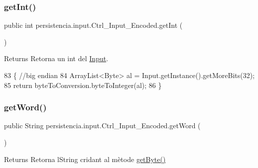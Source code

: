 \subsubsection{\texorpdfstring{get\+Int()}{getInt()}}
{\footnotesize\ttfamily public int persistencia.\+input.\+Ctrl\+\_\+\+Input\+\_\+\+Encoded.\+get\+Int (\begin{DoxyParamCaption}{ }\end{DoxyParamCaption})\hspace{0.3cm}{\ttfamily [inline]}}

\begin{DoxyReturn}{Returns}
Retorna un int del \hyperlink{classpersistencia_1_1input_1_1Input}{Input}. 
\end{DoxyReturn}

\begin{DoxyCode}
83                         \{ \textcolor{comment}{//big endian}
84         ArrayList<Byte> al = Input.getInstance().getMoreBits(32);
85         \textcolor{keywordflow}{return} byteToConversion.byteToInteger(al);
86     \}
\end{DoxyCode}
\mbox{\label{classpersistencia_1_1input_1_1Ctrl__Input__Encoded_a87ebc4b52c5884ba9c397558668e67d7}} 
\subsubsection{\texorpdfstring{get\+Word()}{getWord()}}
{\footnotesize\ttfamily public String persistencia.\+input.\+Ctrl\+\_\+\+Input\+\_\+\+Encoded.\+get\+Word (\begin{DoxyParamCaption}{ }\end{DoxyParamCaption})\hspace{0.3cm}{\ttfamily [inline]}}

\begin{DoxyReturn}{Returns}
Retorna l\textquotesingle{}String cridant al mètode \hyperlink{classpersistencia_1_1input_1_1Ctrl__Input__Encoded_a38ede6bc49251e77ae4be30ccc06457d}{get\+Byte()} 
\end{DoxyReturn}

